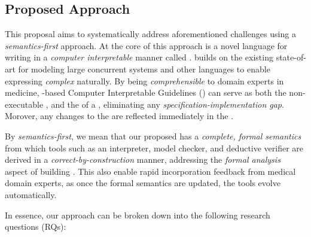 \subsection{Proposed Approach}

This proposal aims to systematically address aforementioned challenges
using a \emph{semantics-first} approach. At the core of this approach
is a novel language for writing \BPGs{} in a \emph{computer interpretable}
manner called \MediK{}. \MediK{} builds on the existing state-of-art
for modeling large concurrent systems and other \CIG{} languages to enable expressing \emph{complex}
\BPGs{} naturally. By being \emph{comprehensible} to domain experts in medicine, \MediK{}-based
Computer Interpretable Guidelines (\CIGs{}) can serve as both the
non-executable \BPG{}, and the \BPGLogic{} of a \CDSS{}, eliminating any
\emph{specification-implementation gap}. Morover, any changes to the
\CIG{} are reflected immediately in the \CDSS{}.


By \emph{semantics-first}, we mean that our proposed
has a \emph{complete, formal semantics} from which tools such as an interpreter, model checker,
and deductive verifier are derived in a \emph{correct-by-construction}
manner, addressing the \emph{formal analysis} aspect of building \CDSSs{}.
This also enable rapid incorporation feedback from
medical domain experts, as once the formal semantics are updated, the
tools evolve automatically.

In essence, our approach can be broken down into the following research
questions (RQs):

